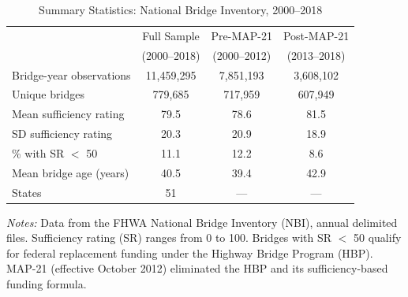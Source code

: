 \begin{table}[htbp]
\centering
\caption{Summary Statistics: National Bridge Inventory, 2000--2018}
\label{tab:summary}
\begin{tabular}{lccc}
\hline\hline
 & Full Sample & Pre-MAP-21 & Post-MAP-21 \\
 & (2000--2018) & (2000--2012) & (2013--2018) \\
\hline
Bridge-year observations & 11,459,295 & 7,851,193 & 3,608,102 \\
Unique bridges & 779,685 & 717,959 & 607,949 \\
Mean sufficiency rating & 79.5 & 78.6 & 81.5 \\
SD sufficiency rating & 20.3 & 20.9 & 18.9 \\
\% with SR $<$ 50 & 11.1 & 12.2 & 8.6 \\
Mean bridge age (years) & 40.5 & 39.4 & 42.9 \\
States & 51 & --- & --- \\
\hline\hline
\end{tabular}
\begin{tablenotes}[flushleft]\small
\item \textit{Notes:} Data from the FHWA National Bridge Inventory (NBI), annual delimited files. Sufficiency rating (SR) ranges from 0 to 100. Bridges with SR $<$ 50 qualify for federal replacement funding under the Highway Bridge Program (HBP). MAP-21 (effective October 2012) eliminated the HBP and its sufficiency-based funding formula.
\end{tablenotes}
\end{table}

